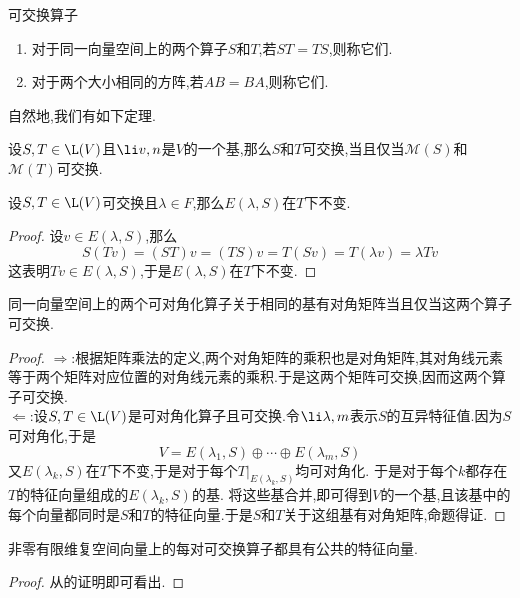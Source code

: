 \documentclass{ctexart}
\begin{document}
\pagestyle{empty}
\begin{center}\large 可交换算子\end{center}
\begin{definition}[1.1 定义:可交换]
    \begin{enumerate}[label=\tbf{(\arabic*)}]
        \item 对于同一向量空间上的两个算子$S$和$T$,若$ST=TS$,则称它们.
        \item 对于两个大小相同的方阵,若$AB=BA$,则称它们.
    \end{enumerate}
\end{definition}\noindent
自然地,我们有如下定理.
\begin{formal}[1.2 可交换算子对应可交换矩阵]
    设$S,T\in\L(V)$且$\li v,n$是$V$的一个基,那么$S$和$T$可交换,当且仅当$\mathcal{M}(S)$和$\mathcal{M}(T)$可交换.
\end{formal}
\begin{formal}[1.3 特征空间在可交换算子下不变]
    设$S,T\in\L(V)$可交换且$\lambda\in F$,那么$E(\lambda,S)$在$T$下不变.
\end{formal}
\begin{proof}
    设$v\in E(\lambda,S)$,那么
    $$S(Tv)=(ST)v=(TS)v=T(Sv)=T(\lambda v)=\lambda Tv$$
    这表明$Tv\in E(\lambda,S)$,于是$E(\lambda,S)$在$T$下不变.
\end{proof}
\begin{formal}[1.4 可同时对角化等价于可交换]
    同一向量空间上的两个可对角化算子关于相同的基有对角矩阵当且仅当这两个算子可交换.
\end{formal}
\begin{proof}
    $\Rightarrow$:根据矩阵乘法的定义,两个对角矩阵的乘积也是对角矩阵,其对角线元素等于两个矩阵对应位置的对角线元素的乘积.于是这两个矩阵可交换,因而这两个算子可交换.\\
    $\Leftarrow$:设$S,T\in\L(V)$是可对角化算子且可交换.令$\li\lambda,m$表示$S$的互异特征值.因为$S$可对角化,于是
    $$V=E(\lambda_1,S)\oplus\cdots\oplus E(\lambda_m,S)$$
    又$E(\lambda_k,S)$在$T$下不变,于是对于每个$T|_{E(\lambda_k,S)}$均可对角化.%
    于是对于每个$k$都存在$T$的特征向量组成的$E(\lambda_k,S)$的基.%
    将这些基合并,即可得到$V$的一个基,且该基中的每个向量都同时是$S$和$T$的特征向量.于是$S$和$T$关于这组基有对角矩阵,命题得证.
\end{proof}
\begin{formal}[1.5 可交换算子的公共特征向量]
    非零有限维复空间向量上的每对可交换算子都具有公共的特征向量.
\end{formal}
\begin{proof}
    从的证明即可看出.
\end{proof}
\end{document}
